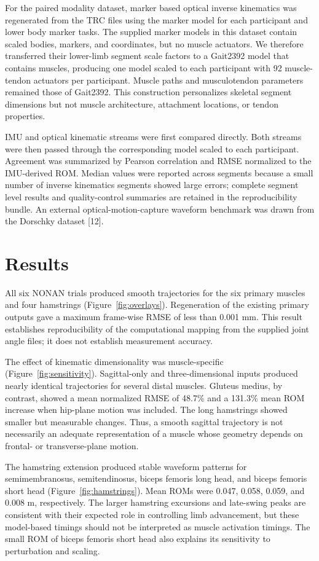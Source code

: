 \documentclass[11pt]{article}
\begin{document}
For the paired modality dataset, marker based optical inverse kinematics was regenerated from the TRC files using the marker model for each participant and lower body marker tasks. The supplied marker models in this dataset contain scaled bodies, markers, and coordinates, but no muscle actuators. We therefore transferred their lower-limb segment scale factors to a Gait2392 model that contains muscles, producing one model scaled to each participant with 92 muscle-tendon actuators per participant. Muscle paths and musculotendon parameters remained those of Gait2392. This construction personalizes skeletal segment dimensions but not muscle architecture, attachment locations, or tendon properties.

IMU and optical kinematic streams were first compared directly. Both streams were then passed through the corresponding model scaled to each participant. Agreement was summarized by Pearson correlation and RMSE normalized to the IMU-derived ROM. Median values were reported across segments because a small number of inverse kinematics segments showed large errors; complete segment level results and quality-control summaries are retained in the reproducibility bundle. An external optical-motion-capture waveform benchmark was drawn from the Dorschky dataset [12].

\section{Results}

All six NONAN trials produced smooth trajectories for the six primary muscles and four hamstrings (Figure~\ref{fig:overlays}). Regeneration of the existing primary outputs gave a maximum frame-wise RMSE of less than 0.001 mm. This result establishes reproducibility of the computational mapping from the supplied joint angle files; it does not establish measurement accuracy.

The effect of kinematic dimensionality was muscle-specific (Figure~\ref{fig:sensitivity}). Sagittal-only and three-dimensional inputs produced nearly identical trajectories for several distal muscles. Gluteus medius, by contrast, showed a mean normalized RMSE of 48.7\% and a 131.3\% mean ROM increase when hip-plane motion was included. The long hamstrings showed smaller but measurable changes. Thus, a smooth sagittal trajectory is not necessarily an adequate representation of a muscle whose geometry depends on frontal- or transverse-plane motion.

The hamstring extension produced stable waveform patterns for semimembranosus, semitendinosus, biceps femoris long head, and biceps femoris short head (Figure~\ref{fig:hamstrings}). Mean ROMs were 0.047, 0.058, 0.059, and 0.008 m, respectively. The larger hamstring excursions and late-swing peaks are consistent with their expected role in controlling limb advancement, but these model-based timings should not be interpreted as muscle activation timings. The small ROM of biceps femoris short head also explains its sensitivity to perturbation and scaling.
\end{document}
